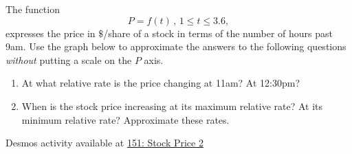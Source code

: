 \documentclass{ximera}
\begin{document}
\begin{question}  \label{Qd55gbchhtt}

The function 
\[
      P = f(t) \, , \, 1\leq t \leq 3.6 , 
\]
expresses the price in $\$$/share of a stock in terms of the number of hours past 9am. Use the graph below to approximate the answers to the following questions \emph{without} putting a scale on the $P$ axis.

\begin{enumerate}
\item At what relative rate is the price changing at 11am? At 12:30pm?

\item When is the stock price increasing at its maximum relative rate? At its minimum relative rate? Approximate these rates.

\end{enumerate}

\begin{onlineOnly}
    \begin{center}
\end{center}
\end{onlineOnly}

Desmos activity available at \href{https://www.desmos.com/calculator/4b18d1d54e}{151: Stock Price 2}
\end{question}
\end{document}
